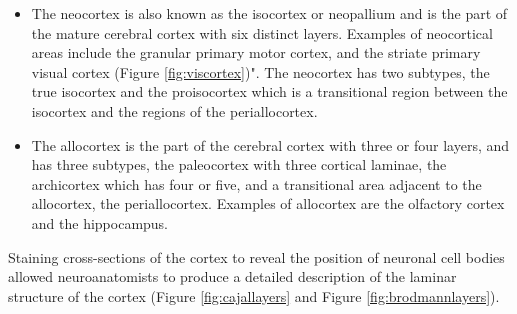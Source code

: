 \begin{itemize}
\tightlist
\item
  The neocortex is also known as the isocortex or neopallium and is the part of the mature cerebral cortex with six distinct layers. Examples of neocortical areas include the granular primary motor cortex, and the striate primary visual cortex (Figure \ref{fig:viscortex})". The neocortex has two subtypes, the true isocortex and the proisocortex which is a transitional region between the isocortex and the regions of the periallocortex.
\item
  The allocortex is the part of the cerebral cortex with three or four layers, and has three subtypes, the paleocortex with three cortical laminae, the archicortex which has four or five, and a transitional area adjacent to the allocortex, the periallocortex. Examples of allocortex are the olfactory cortex and the hippocampus.
\end{itemize}

Staining cross-sections of the cortex to reveal the position of neuronal cell bodies allowed neuroanatomists to produce a detailed description of the laminar structure of the cortex (Figure \ref{fig:cajallayers} and Figure \ref{fig:brodmannlayers}).



